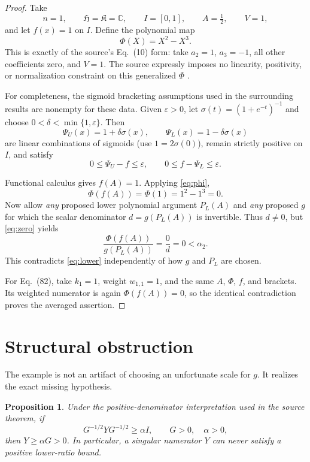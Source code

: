 \documentclass[11pt]{article}
\newtheorem{proposition}{Proposition}
\newcommand{\C}{\mathbb C}
\begin{document}
\begin{proof}
Take
\[
 n=1,\qquad \mathfrak H=\mathfrak K=\C,\qquad I=[0,1],
 \qquad A=\tfrac12,\qquad V=1,
\]
and let $f(x)=1$ on $I$.  Define the polynomial map
\begin{equation}\label{eq:phi}
 \Phi(X)=X^2-X^3.
\end{equation}
This is exactly of the source's Eq.~(10) form: take $a_2=1$, $a_3=-1$,
all other coefficients zero, and $V=1$.  The source expressly imposes no
linearity, positivity, or normalization constraint on this generalized
$\Phi$ \cite[p.~5]{Chang}.

For completeness, the sigmoid bracketing assumptions used in the surrounding
results are nonempty for these data.  Given $\varepsilon>0$, let
$\sigma(t)=(1+e^{-t})^{-1}$ and choose
$0<\delta<\min\{1,\varepsilon\}$.  Then
\[
 \Psi_U(x)=1+\delta\sigma(x),\qquad
 \Psi_L(x)=1-\delta\sigma(x)
\]
are linear combinations of sigmoids (use $1=2\sigma(0)$), remain strictly
positive on $I$, and satisfy
\[
 0\leq\Psi_U-f\leq\varepsilon,
 \qquad 0\leq f-\Psi_L\leq\varepsilon.
\]

Functional calculus gives $f(A)=1$.  Applying \eqref{eq:phi},
\begin{equation}\label{eq:zero}
 \Phi(f(A))=\Phi(1)=1^2-1^3=0.
\end{equation}
Now allow \emph{any} proposed lower polynomial argument $P_L(A)$ and
\emph{any} proposed $g$ for which the scalar denominator
$d=g(P_L(A))$ is invertible.  Thus $d\neq0$, but \eqref{eq:zero} yields
\[
 \frac{\Phi(f(A))}{g(P_L(A))}=\frac0d=0<\alpha _2.
\]
This contradicts \eqref{eq:lower} independently of how $g$ and $P_L$ are
chosen.

For Eq.~(82), take $k_1=1$, weight $w_{1,1}=1$, and the same $A$, $\Phi$,
$f$, and brackets.  Its weighted numerator is again $\Phi(f(A))=0$, so the
identical contradiction proves the averaged assertion.
\end{proof}

\section*{Structural obstruction}
The example is not an artifact of choosing an unfortunate scale for $g$.
It realizes the exact missing hypothesis.

\begin{proposition}\label{prop:obstruction}
Under the positive-denominator interpretation used in the source theorem,
if
\[
 G^{-1/2}YG^{-1/2}\geq\alpha I,
 \qquad G>0,\quad \alpha>0,
\]
then $Y\geq\alpha G>0$.  In particular, a singular numerator $Y$ can never
satisfy a positive lower-ratio bound.
\end{proposition}
\end{document}
